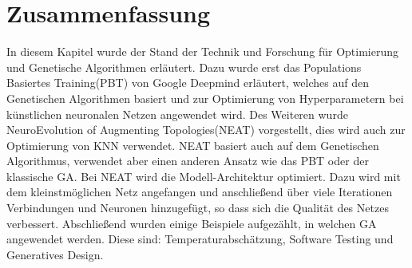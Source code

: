 \newpage

\section{Zusammenfassung}
In diesem Kapitel wurde der Stand der Technik und Forschung für Optimierung und Genetische Algorithmen erläutert. Dazu wurde erst das Populations Basiertes Training(PBT) von Google Deepmind erläutert, welches auf den Genetischen Algorithmen basiert und zur Optimierung von Hyperparametern bei künstlichen neuronalen Netzen angewendet wird. Des Weiteren wurde NeuroEvolution of Augmenting Topologies(NEAT) vorgestellt, dies wird auch zur Optimierung von KNN verwendet. NEAT basiert auch auf dem Genetischen Algorithmus, verwendet aber einen anderen Ansatz wie das PBT oder der klassische GA. Bei NEAT wird die Modell-Architektur optimiert. Dazu wird mit dem kleinstmöglichen Netz angefangen und anschließend über viele Iterationen Verbindungen und Neuronen hinzugefügt, so dass sich die Qualität des Netzes verbessert. Abschließend wurden einige Beispiele aufgezählt, in welchen GA angewendet werden. Diese sind: Temperaturabschätzung, Software Testing und Generatives Design.